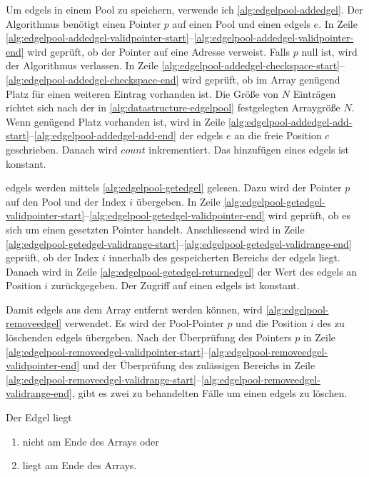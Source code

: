Um \gls{edgels} in einem Pool zu speichern, verwende ich \autoref{alg:edgelpool-addedgel}. Der Algorithmus benötigt
 einen Pointer $p$ auf einen Pool und einen \gls{edgels} $e$. In Zeile
 \ref{alg:edgelpool-addedgel-validpointer-start}--\ref{alg:edgelpool-addedgel-validpointer-end} wird geprüft, ob der
 Pointer auf eine Adresse verweist. Falls $p$ null ist, wird der Algorithmus verlassen. In Zeile
 \ref{alg:edgelpool-addedgel-checkspace-start}--\ref{alg:edgelpool-addedgel-checkspace-end} wird geprüft, ob im Array
 genügend Platz für einen weiteren Eintrag vorhanden ist. Die Größe von $N$ Einträgen richtet sich nach der in \autoref{alg:datastructure-edgelpool} festgelegten Arraygröße $N$. Wenn genügend Platz vorhanden ist, wird in Zeile
 \ref{alg:edgelpool-addedgel-add-start}--\ref{alg:edgelpool-addedgel-add-end} der \gls{edgels} $e$ an die freie
 Position $c$ geschrieben. Danach wird $\mathit{count}$ inkrementiert. Das hinzufügen eines \gls{edgels} ist konstant.



\gls{edgels} werden mittels \autoref{alg:edgelpool-getedgel} gelesen. Dazu wird der Pointer $p$ auf den Pool und der
 Index $i$ übergeben. In Zeile
 \ref{alg:edgelpool-getedgel-validpointer-start}--\ref{alg:edgelpool-getedgel-validpointer-end} wird geprüft, ob es
 sich um einen gesetzten Pointer handelt. Anschliessend wird in Zeile
 \ref{alg:edgelpool-getedgel-validrange-start}--\ref{alg:edgelpool-getedgel-validrange-end} geprüft, ob der Index $i$
 innerhalb des gespeicherten Bereichs der \gls{edgels} liegt. Danach wird in Zeile
 \ref{alg:edgelpool-getedgel-returnedgel} der Wert des \gls{edgels} an Position $i$ zurückgegeben. Der Zugriff auf
 einen \gls{edgels} ist konstant.



Damit \gls{edgels} aus dem Array entfernt werden können, wird \autoref{alg:edgelpool-removeedgel} verwendet. Es wird der
 Pool-Pointer $p$ und die Position $i$ des zu löschenden \gls{edgels} übergeben. Nach der Überprüfung des Pointers $p$
 in Zeile \ref{alg:edgelpool-removeedgel-validpointer-start}--\ref{alg:edgelpool-removeedgel-validpointer-end} und der
 Überprüfung des zulässigen Bereichs in Zeile
 \ref{alg:edgelpool-removeedgel-validrange-start}--\ref{alg:edgelpool-removeedgel-validrange-end}, gibt es zwei zu
 behandelten Fälle um einen \gls{edgels} zu löschen.



Der Edgel liegt
\begin{enumerate}
	\item nicht am Ende des Arrays oder \label{removeedgel-worst}
	\item liegt am Ende des Arrays. \label{removeedgel-best}
\end{enumerate}

